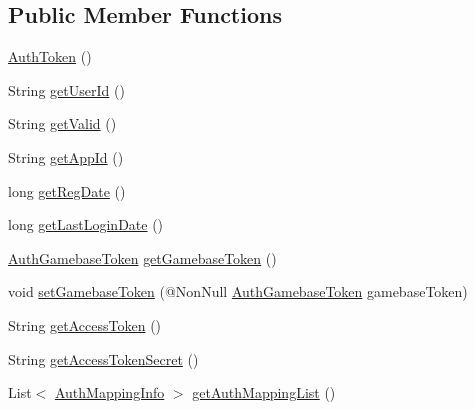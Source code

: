 \subsection*{Public Member Functions}
\begin{DoxyCompactItemize}
\item 
\hyperlink{classcom_1_1toast_1_1android_1_1gamebase_1_1auth_1_1data_1_1_auth_token_a5847a054f330f4633df0146edeba445e}{Auth\+Token} ()
\item 
String \hyperlink{classcom_1_1toast_1_1android_1_1gamebase_1_1auth_1_1data_1_1_auth_token_a1a86b0102452494152fce9535952e4f4}{get\+User\+Id} ()
\item 
String \hyperlink{classcom_1_1toast_1_1android_1_1gamebase_1_1auth_1_1data_1_1_auth_token_af6527912d52486ab15647492fc1efd89}{get\+Valid} ()
\item 
String \hyperlink{classcom_1_1toast_1_1android_1_1gamebase_1_1auth_1_1data_1_1_auth_token_a240d4abd81a68efe7d3b9e10537763f5}{get\+App\+Id} ()
\item 
long \hyperlink{classcom_1_1toast_1_1android_1_1gamebase_1_1auth_1_1data_1_1_auth_token_a9532e1636d0dfc2bee56231288f3eb43}{get\+Reg\+Date} ()
\item 
long \hyperlink{classcom_1_1toast_1_1android_1_1gamebase_1_1auth_1_1data_1_1_auth_token_a3e6149a376b84d624d870b98d7d5d0c7}{get\+Last\+Login\+Date} ()
\item 
\hyperlink{classcom_1_1toast_1_1android_1_1gamebase_1_1auth_1_1data_1_1_auth_gamebase_token}{Auth\+Gamebase\+Token} \hyperlink{classcom_1_1toast_1_1android_1_1gamebase_1_1auth_1_1data_1_1_auth_token_aacb53e69ee9426bcde965e1e7b71a24c}{get\+Gamebase\+Token} ()
\item 
void \hyperlink{classcom_1_1toast_1_1android_1_1gamebase_1_1auth_1_1data_1_1_auth_token_ad41eb50dce69a6ee53cc496b6054928c}{set\+Gamebase\+Token} (@Non\+Null \hyperlink{classcom_1_1toast_1_1android_1_1gamebase_1_1auth_1_1data_1_1_auth_gamebase_token}{Auth\+Gamebase\+Token} gamebase\+Token)
\item 
String \hyperlink{classcom_1_1toast_1_1android_1_1gamebase_1_1auth_1_1data_1_1_auth_token_ae5d68509be41985a7f70a8fb907a576a}{get\+Access\+Token} ()
\item 
String \hyperlink{classcom_1_1toast_1_1android_1_1gamebase_1_1auth_1_1data_1_1_auth_token_a2f7a6155ef340f2ff7922b6ace1df44a}{get\+Access\+Token\+Secret} ()
\item 
List$<$ \hyperlink{classcom_1_1toast_1_1android_1_1gamebase_1_1auth_1_1data_1_1_auth_mapping_info}{Auth\+Mapping\+Info} $>$ \hyperlink{classcom_1_1toast_1_1android_1_1gamebase_1_1auth_1_1data_1_1_auth_token_afc189ebb8fdc52a6d5428a80055b767a}{get\+Auth\+Mapping\+List} ()

\end{DoxyCompactItemize}
